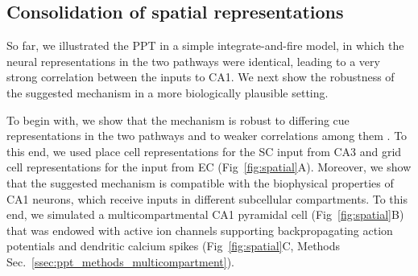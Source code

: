 
\subsection{Consolidation of spatial representations}
\label{sec:results_linear_track}


So far, we illustrated the PPT in a simple integrate-and-fire model, in which the neural representations in the two pathways were identical, leading to a very strong correlation between the inputs to CA1. We next show the robustness of the suggested mechanism in a more biologically plausible setting.


To begin with, we show that the mechanism is robust to differing cue representations in the two pathways and to weaker correlations among them \cite{ONeill2017}. To this end, we used place cell representations \cite{OKeefe1971} for the SC input from CA3 and grid cell representations \cite{Hafting2005, Moser2008} for the \ppca input from EC (Fig~\ref{fig:spatial}A).
Moreover, we show that the suggested mechanism is compatible with the biophysical properties of CA1 neurons, which receive inputs in different subcellular compartments. To this end, we simulated a multicompartmental CA1 pyramidal cell (Fig~\ref{fig:spatial}B) that was endowed with active ion channels supporting backpropagating action potentials and dendritic calcium spikes (Fig~\ref{fig:spatial}C, Methods Sec.~\ref{ssec:ppt_methods_multicompartment}).

